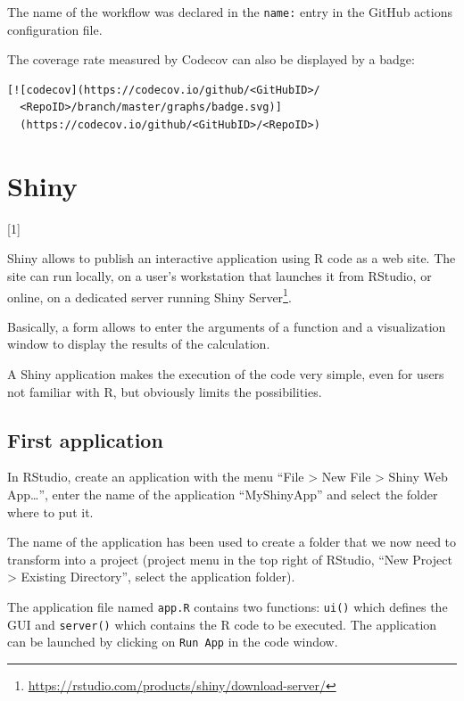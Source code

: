 \documentclass[
  12pt,
  american,
  a4paper,
  extrafontsizes,onecolumn,openright
  ]{memoir}
\newcommand{\toc}[1]{%
  \startcontents[chapters]%
  \printcontents[chapters]{}{1}[#1]{}%
  ~\newline%
}
\begin{document}
The name of the workflow was declared in the \texttt{name:} entry in the GitHub actions configuration file.

The coverage rate measured by Codecov can also be displayed by a badge:

\begin{verbatim}
[![codecov](https://codecov.io/github/<GitHubID>/
  <RepoID>/branch/master/graphs/badge.svg)]
  (https://codecov.io/github/<GitHubID>/<RepoID>)
\end{verbatim}

\chapter{Shiny}\label{chap-shiny}

\toc{1}

Shiny allows to publish an interactive application using R code as a web site.
The site can run locally, on a user's workstation that launches it from RStudio, or online, on a dedicated server running Shiny Server\footnote{\url{https://rstudio.com/products/shiny/download-server/}}.

Basically, a form allows to enter the arguments of a function and a visualization window to display the results of the calculation.

A Shiny application makes the execution of the code very simple, even for users not familiar with R, but obviously limits the possibilities.

\section{First application}\label{first-application}

In RStudio, create an application with the menu \enquote{File \textgreater{} New File \textgreater{} Shiny Web App\ldots{}}, enter the name of the application \enquote{MyShinyApp} and select the folder where to put it.

The name of the application has been used to create a folder that we now need to transform into a project (project menu in the top right of RStudio, \enquote{New Project \textgreater{} Existing Directory}, select the application folder).

The application file named \texttt{app.R} contains two functions: \texttt{ui()} which defines the GUI and \texttt{server()} which contains the R code to be executed.
The application can be launched by clicking on \texttt{Run\ App} in the code window.
\end{document}
